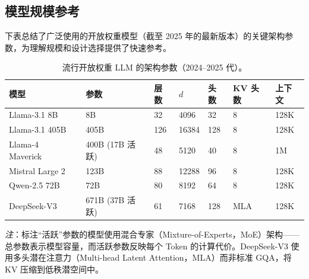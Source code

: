 \subsection{模型规模参考}
\label{model-size-reference}

下表总结了广泛使用的开放权重模型（截至 2025 年的最新版本）的关键架构参数，为理解规模和设计选择提供了快速参考。

\begin{table}[ht!]
\centering\small
\caption{流行开放权重 LLM 的架构参数（2024--2025 代）。}
\noindent\begin{tabularx}{\linewidth}{@{}l Z{1.38} Z{0.92} Z{0.92} Z{0.92} Z{0.92} Z{0.94}@{}}
\toprule
\textbf{模型} & \textbf{参数} & \textbf{层数} & \textbf{$d$} & \textbf{头数} & \textbf{KV 头数} & \textbf{上下文} \\
\midrule
Llama-3.1 8B~\cite{grattafiori2024llama3} & 8B & 32 & 4096 & 32 & 8 & 128K \\
Llama-3.1 405B~\cite{grattafiori2024llama3} & 405B & 126 & 16384 & 128 & 8 & 128K \\
Llama-4 Maverick~\cite{meta2025llama4} & 400B (17B 活跃) & 48 & 5120 & 40 & 8 & 1M \\
Mistral Large 2~\cite{jiang2024mistrallarge2} & 123B & 88 & 12288 & 96 & 8 & 128K \\
Qwen-2.5 72B~\cite{qwen2024qwen25} & 72B & 80 & 8192 & 64 & 8 & 128K \\
DeepSeek-V3~\cite{deepseekv3} & 671B (37B 活跃) & 61 & 7168 & 128 & MLA & 128K \\
\bottomrule
\end{tabularx}
\end{table}

\emph{注}：标注``活跃''参数的模型使用混合专家（Mixture-of-Experts，MoE）架构——总参数表示模型容量，而活跃参数反映每个 Token 的计算代价。DeepSeek-V3 使用多头潜在注意力（Multi-head Latent Attention，MLA）而非标准 GQA，将 KV 压缩到低秩潜空间中。

